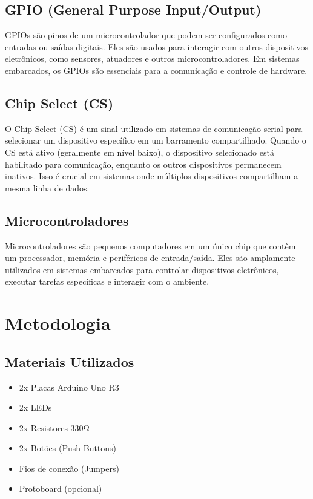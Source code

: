 \documentclass[12pt, a4paper]{article}
\begin{document}
\subsection{GPIO (General Purpose Input/Output)}
GPIOs são pinos de um microcontrolador que podem ser configurados como entradas ou saídas digitais. Eles são usados para interagir com outros dispositivos eletrônicos, como sensores, atuadores e outros microcontroladores. Em sistemas embarcados, os GPIOs são essenciais para a comunicação e controle de hardware.
\subsection{Chip Select (CS)}
O Chip Select (CS) é um sinal utilizado em sistemas de comunicação serial para selecionar um dispositivo específico em um barramento compartilhado. Quando o CS está ativo (geralmente em nível baixo), o dispositivo selecionado está habilitado para comunicação, enquanto os outros dispositivos permanecem inativos. Isso é crucial em sistemas onde múltiplos dispositivos compartilham a mesma linha de dados.
\subsection{Microcontroladores}
Microcontroladores são pequenos computadores em um único chip que contêm um processador, memória e periféricos de entrada/saída. Eles são amplamente utilizados em sistemas embarcados para controlar dispositivos eletrônicos, executar tarefas específicas e interagir com o ambiente.

\newpage
\section{Metodologia}
\subsection{Materiais Utilizados}
\begin{itemize}
	\item 2x Placas Arduino Uno R3
	\item 2x LEDs
	\item 2x Resistores 330Ω
	\item 2x Botões (Push Buttons)
	\item Fios de conexão (Jumpers)
	\item Protoboard (opcional)
\end{itemize}
\end{document}
